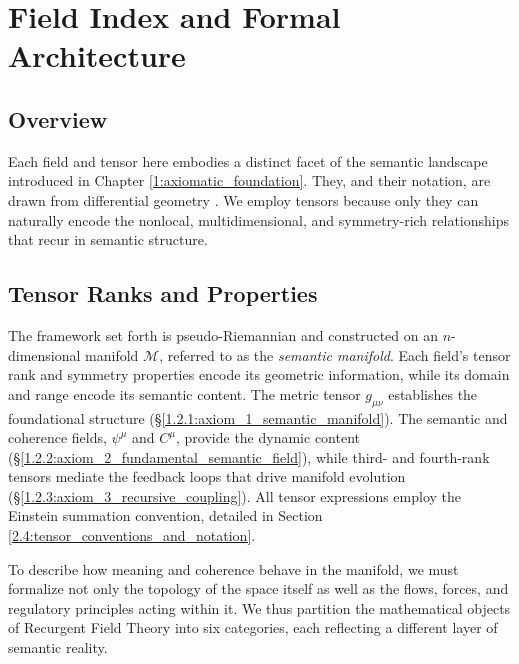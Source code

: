 \chapter{Field Index and Formal Architecture}
\label{2:field_index_and_formal_architecture}


\section{Overview}
\label{2.1:overview}

Each field and tensor here embodies a distinct facet of the semantic landscape introduced in Chapter \ref{1:axiomatic_foundation}. They, and their notation, are drawn from differential geometry \autocite{Riemann1868, Lee2012}. We employ tensors because only they can naturally encode the nonlocal, multidimensional, and symmetry-rich relationships that recur in semantic structure.


\section{Tensor Ranks and Properties}
\label{2.2:tensor_ranks_and_properties}

The framework set forth is pseudo-Riemannian and constructed on an \(n\)-dimensional manifold \(\mathcal{M}\), referred to as the \textit{semantic manifold}. Each field's tensor rank and symmetry properties encode its geometric information, while its domain and range encode its semantic content. The metric tensor \(g_{\mu\nu}\) establishes the foundational structure (\S\ref{1.2.1:axiom_1_semantic_manifold}). The semantic and coherence fields, \(\psi^\mu\) and \(C^\mu\), provide the dynamic content (\S\ref{1.2.2:axiom_2_fundamental_semantic_field}), while third- and fourth-rank tensors mediate the feedback loops that drive manifold evolution (\S\ref{1.2.3:axiom_3_recursive_coupling}). All tensor expressions employ the Einstein summation convention, detailed in Section \ref{2.4:tensor_conventions_and_notation}.

To describe how meaning and coherence behave in the manifold, we must formalize not only the topology of the space itself as well as the flows, forces, and regulatory principles acting within it. We thus partition the mathematical objects of Recurgent Field Theory into six categories, each reflecting a different layer of semantic reality.


